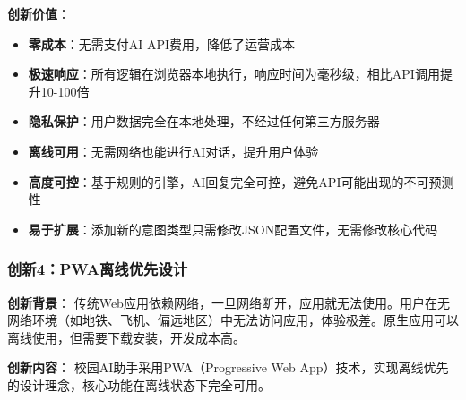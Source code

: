 \documentclass[12pt,a4paper]{article}
\begin{document}
\textbf{创新价值}：
\begin{itemize}
    \item \textbf{零成本}：无需支付AI API费用，降低了运营成本
    \item \textbf{极速响应}：所有逻辑在浏览器本地执行，响应时间为毫秒级，相比API调用提升10-100倍
    \item \textbf{隐私保护}：用户数据完全在本地处理，不经过任何第三方服务器
    \item \textbf{离线可用}：无需网络也能进行AI对话，提升用户体验
    \item \textbf{高度可控}：基于规则的引擎，AI回复完全可控，避免API可能出现的不可预测性
    \item \textbf{易于扩展}：添加新的意图类型只需修改JSON配置文件，无需修改核心代码
\end{itemize}

\subsubsection{创新4：PWA离线优先设计}

\textbf{创新背景}：
传统Web应用依赖网络，一旦网络断开，应用就无法使用。用户在无网络环境（如地铁、飞机、偏远地区）中无法访问应用，体验极差。原生应用可以离线使用，但需要下载安装，开发成本高。

\textbf{创新内容}：
校园AI助手采用PWA（Progressive Web App）技术，实现离线优先的设计理念，核心功能在离线状态下完全可用。
\end{document}
